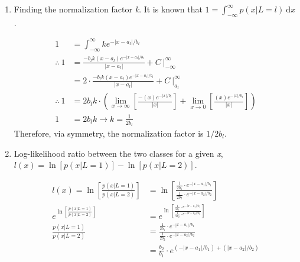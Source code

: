 \documentclass[12pt,A4]{article}
\begin{document}
\begin{enumerate}
    \item Finding the normalization factor \textit{k}. It is known that \(1 = \int_{-\infty}^{\infty}p(x|L=l) \ \mathrm{d}x\).
    
    \begin{align*}
        1 &= \int_{-\infty}^{\infty} \! ke^{-|x - a_l| / b_l} \\
        \therefore \ 1 &= \frac{-b_lk(x-a_l)e^{-|x-a_l|/b_l}}{|x-a_l|} + C \ \Big|_{-\infty}^{\infty} \\
         &= 2 \cdot \frac{-b_lk(x-a_l)e^{-|x-a_l|/b_l}}{|x-a_l|} + C \ \Big|_{a_l}^{\infty} \\
        \therefore \ 1 &= 2b_lk \cdot \left(\lim_{x \to \infty}\left[ \frac{-(x)e^{-|x|/b_l}}{|x|} \right] +
        \lim_{x \to 0}\left[ \frac{(x)e^{-|x|/b_l}}{|x|}\right]\right) \\
        1 &= 2b_lk \longrightarrow \boxed{k = \frac{1}{2b_l}}
    \end{align*}
    Therefore, via symmetry, the normalization factor is \(1/2b_l\).
    \item Log-likelihood ratio between the two classes for a given \textit{x}, \(l(x) = \ln[p(x|L = 1)] - \ln[p(x|L = 2)]\).
    
    \begin{align*}
        l(x) = \ln\left[\frac{p(x|L=1)}{p(x|L=2)}\right] &= \ln\left[ \frac{\frac{1}{2b_1} \cdot e^{-|x-a_1|/b_1}}{\frac{1}{2b_2} \cdot e^{-|x-a_2|/b_2}} \right] \\
        e^{\ln\left[\frac{p(x|L=1)}{p(x|L=2)}\right]} &= e^{\ln\left[ \frac{\frac{1}{2b_1} \cdot e^{-|x-a_1|/b_1}}{\frac{1}{2b_2} \cdot e^{-|x-a_2|/b_2}} \right]}\\
        \frac{p(x|L=1)}{p(x|L=2)} &= \frac{\frac{1}{2b_1} \cdot e^{-|x-a_1|/b_1}}{\frac{1}{2b_2} \cdot e^{-|x-a_2|/b_2}} \\
        &= \boxed{\frac{b_2}{b_1} \cdot e^{(-|x-a_1|/b_1) + (|x-a_2|/b_2)}}
    \end{align*}
    

\end{enumerate}
\end{document}
